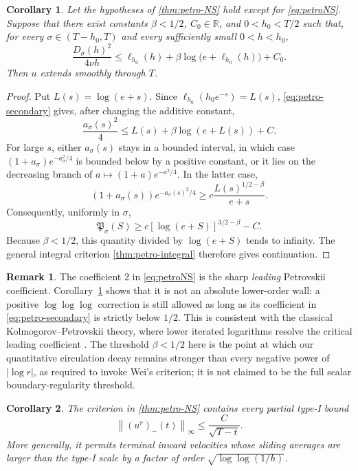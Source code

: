 \documentclass[11pt]{article}
\numberwithin{equation}{section}
\newtheorem{corollary}[corollary]{Corollary}
\theoremstyle{definition}
\newtheorem{remark}[remark]{Remark}
\newcommand{\R}{\mathbb R}
\newcommand{\norm}[1]{\left\lVert #1\right\rVert}
\begin{document}
\begin{corollary}\label{cor:petro-secondary}
Let the hypotheses of \cref{thm:petro-NS} hold except for \eqref{eq:petroNS}.  Suppose that there exist constants $\beta<1/2$, $C_0\in\R$, and $0<h_0<T/2$ such that, for every $\sigma\in(T-h_0,T)$ and every sufficiently small $0<h<h_0$,
\begin{equation}\label{eq:petro-secondary}
 \frac{D_\sigma(h)^2}{4\nu h}
 \le
 \ell_{h_0}(h)
 +\beta\log\!\bigl(e+\ell_{h_0}(h)\bigr)+C_0.
\end{equation}
Then $u$ extends smoothly through $T$.
\end{corollary}

\begin{proof}
Put $L(s)=\log(e+s)$.  Since $\ell_{h_0}(h_0e^{-s})=L(s)$, \eqref{eq:petro-secondary} gives, after changing the additive constant,
\[
 \frac{a_\sigma(s)^2}{4}
 \le L(s)+\beta\log(e+L(s))+C.
\]
For large $s$, either $a_\sigma(s)$ stays in a bounded interval, in which case $(1+a_\sigma)e^{-a_\sigma^2/4}$ is bounded below by a positive constant, or it lies on the decreasing branch of $a\mapsto(1+a)e^{-a^2/4}$.  In the latter case,
\[
 (1+a_\sigma(s))e^{-a_\sigma(s)^2/4}
 \ge
 c\frac{L(s)^{1/2-\beta}}{e+s}.
\]
Consequently, uniformly in $\sigma$,
\[
 \mathfrak P_\sigma(S)
 \ge c[\log(e+S)]^{3/2-\beta}-C.
\]
Because $\beta<1/2$, this quantity divided by $\log(e+S)$ tends to infinity.  The general integral criterion \cref{thm:petro-integral} therefore gives continuation.
\end{proof}

\begin{remark}\label{rem:petro-leading}
The coefficient $2$ in \eqref{eq:petroNS} is the sharp \emph{leading} Petrovskii coefficient.  Corollary~\ref{cor:petro-secondary} shows that it is not an absolute lower-order wall: a positive $\log\log\log$ correction is still allowed as long as its coefficient in \eqref{eq:petro-secondary} is strictly below $1/2$.  This is consistent with the classical Kolmogorov--Petrovskii theory, where lower iterated logarithms resolve the critical leading coefficient \cite{Abdulla2005}.  The threshold $\beta<1/2$ here is the point at which our quantitative circulation decay remains stronger than every negative power of $|\log r|$, as required to invoke Wei's criterion; it is not claimed to be the full scalar boundary-regularity threshold.
\end{remark}

\begin{corollary}\label{cor:partial-typeI}
The criterion in \cref{thm:petro-NS} contains every partial type-I bound
\[
 \norm{(u^r)_-(t)}_\infty\le\frac{C}{\sqrt{T-t}}.
\]
More generally, it permits terminal inward velocities whose sliding averages are larger than the type-I scale by a factor of order $\sqrt{\log\log(1/h)}$.
\end{corollary}
\end{document}
